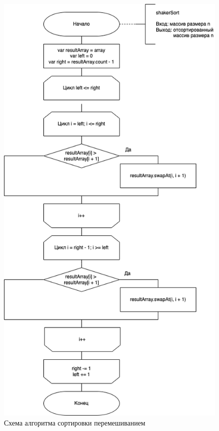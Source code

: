 \begin{figure}[h!]
	\centering
	\includegraphics[scale=0.65]{img/Shaker.png}
	\caption{Схема алгоритма сортировки перемешиванием}
	\label{fig:mpr}
\end{figure}

